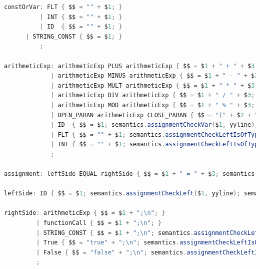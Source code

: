 \documentclass[12pt]{report}
\begin{document}
\begin{singlespace}
\begin{lstlisting}[language=Java,label=some-code,caption={flood$\_$grammar.y}]
constOrVar: FLT { $$ = "" + $1; }
          | INT { $$ = "" + $1; }
          | ID  { $$ = "" + $1; }
	  | STRING_CONST { $$ = $1; }
          ;

arithmeticExp: arithmeticExp PLUS arithmeticExp { $$ = $1 + " + " + $3 ; semantics.checkForBadAdditionType(yyline);}
             | arithmeticExp MINUS arithmeticExp { $$ = $1 + " - " + $3; semantics.checkForBadArithmeticType(yyline);}
             | arithmeticExp MULT arithmeticExp { $$ = $1 + " * " + $3; semantics.checkForBadArithmeticType(yyline);}
             | arithmeticExp DIV arithmeticExp { $$ = $1 + " / " + $3; semantics.checkForBadArithmeticType(yyline);}
             | arithmeticExp MOD arithmeticExp { $$ = $1 + " % " + $3; semantics.checkForBadArithmeticType(yyline);}
             | OPEN_PARAN arithmeticExp CLOSE_PARAN { $$ = "(" + $2 + ")"; }
             | ID  { $$ = $1; semantics.assignmentCheckVar($1, yyline); }
             | FLT { $$ = "" + $1; semantics.assignmentCheckLeftIsOfType("float", yyline); }
             | INT { $$ = "" + $1; semantics.assignmentCheckLeftIsOfType("int", yyline); }
             ;

assignment: leftSide EQUAL rightSide { $$ = $1 + " = " + $3; semantics.funcReturnFlag=false;}

leftSide: ID { $$ = $1; semantics.assignmentCheckLeft($1, yyline); semantics.funcReturnFlag=true;}

rightSide: arithmeticExp { $$ = $1 + ";\n"; }
         | functionCall { $$ = $1 + ";\n"; }
         | STRING_CONST { $$ = $1 + ";\n"; semantics.assignmentCheckLeftIsOfType("String", yyline); }
         | True { $$ = "true" + ";\n"; semantics.assignmentCheckLeftIsOfType("boolean", yyline); }
         | False { $$ = "false" + ";\n"; semantics.assignmentCheckLeftIsOfType("boolean", yyline); }
         ;


\end{lstlisting}
\end{singlespace}
\end{document}

